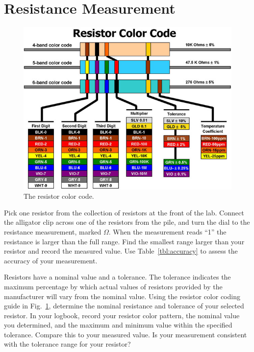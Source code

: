 \section{Resistance Measurement}

\begin{figure}[htbp]
\begin{center}
\includegraphics[height=0.45\textheight]{figs/labs/dc_circuits/rcolor.jpg}
\caption{The resistor color code.}
\label{fig:rcolor}
\end{center}
\end{figure}

\begin{measurement} 
Pick one resistor from the collection of resistors at the front of the
lab.  Connect the alligator clip across one of the resistors from the
pile, and turn the dial to the resistance measurement, marked
$\Omega$.  When the measurement reads ``1'' the resistance is larger
than the full range.  Find the smallest range larger than your
resistor and record the measured value. Use Table~\ref{tbl:accuracy}
to assess the accuracy of your measurement.

Resistors have a nominal value and a tolerance.  The tolerance
indicates the maximum percentage by which actual values of resistors
provided by the manufacturer will vary from the nominal value.  Using
the resistor color coding guide in Fig.~\ref{fig:rcolor}, determine
the nominal resistance and tolerance of your selected resistor.  In
your logbook, record your resistor color pattern, the nominal value
you determined, and the maximum and minimum value within the specified
tolerance. Compare this to your measured value.  Is your measurement
consistent with the tolerance range for your resistor?
\end{measurement}

